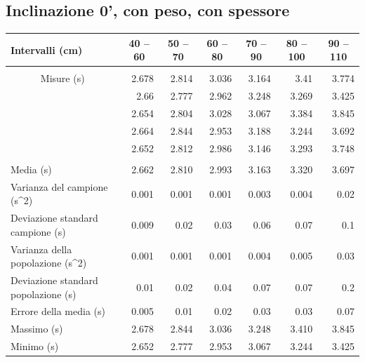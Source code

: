 \documentclass[12pt]{article} %
\begin{document}
	\subsection {Inclinazione 0', con peso, con spessore}
		\begin{table}[H]
			\begin{tabular}{|l|r|r|r|r|r|r|}
			\hline
			Intervalli (cm) & \multicolumn{1}{c|}{40 – 60} & \multicolumn{1}{c|}{50 – 70} & \multicolumn{1}{c|}{60 – 80} & \multicolumn{1}{c|}{70 – 90} & \multicolumn{1}{c|}{80 – 100} & \multicolumn{1}{c|}{90 – 110} \\ \hline
			 & \multicolumn{ 6}{l|}{} \\ \hline
			\multicolumn{ 1}{|c|}{Misure (s)} & 2.678 & 2.814 & 3.036 & 3.164 & 3.41 & 3.774 \\ \cline{ 2- 7}
			\multicolumn{ 1}{|l|}{} & 2.66 & 2.777 & 2.962 & 3.248 & 3.269 & 3.425 \\ \cline{ 2- 7}
			\multicolumn{ 1}{|l|}{} & 2.654 & 2.804 & 3.028 & 3.067 & 3.384 & 3.845 \\ \cline{ 2- 7}
			\multicolumn{ 1}{|l|}{} & 2.664 & 2.844 & 2.953 & 3.188 & 3.244 & 3.692 \\ \cline{ 2- 7}
			\multicolumn{ 1}{|l|}{} & 2.652 & 2.812 & 2.986 & 3.146 & 3.293 & 3.748 \\ \hline
			 & \multicolumn{ 6}{c|}{} \\ \hline
			Media (s) & 2.662 & 2.810 & 2.993 & 3.163 & 3.320 & 3.697 \\ \hline
			Varianza del campione (s^2) & 0.001 & 0.001 & 0.001 & 0.003 & 0.004 & 0.02 \\ \hline
			Deviazione standard campione (s) & 0.009 & 0.02 & 0.03 & 0.06 & 0.07 & 0.1 \\ \hline
			Varianza della popolazione (s^2) & 0.001 & 0.001 & 0.001 & 0.004 & 0.005 & 0.03 \\ \hline
			Deviazione standard popolazione (s) & 0.01 & 0.02 & 0.04 & 0.07 & 0.07 & 0.2 \\ \hline
			Errore della media (s) & 0.005 & 0.01 & 0.02 & 0.03 & 0.03 & 0.07 \\ \hline
			Massimo (s) & 2.678 & 2.844 & 3.036 & 3.248 & 3.410 & 3.845 \\ \hline
			Minimo (s) & 2.652 & 2.777 & 2.953 & 3.067 & 3.244 & 3.425 \\ \hline
			\end{tabular}

		\label{0ap}
		\end{table}
\end{document}
